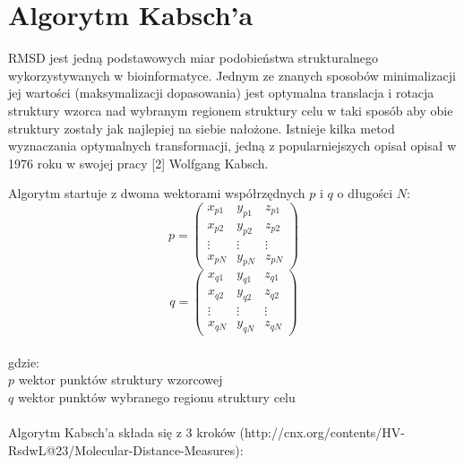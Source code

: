 \documentclass[licencjacka]{pracamgr}
\begin{document}
\section{Algorytm Kabsch'a}
RMSD jest jedną podstawowych miar podobieństwa strukturalnego wykorzystywanych w bioinformatyce. Jednym ze znanych sposobów minimalizacji jej wartości (maksymalizacji dopasowania) jest optymalna translacja i rotacja struktury wzorca nad wybranym regionem struktury celu w taki sposób aby obie struktury zostały jak najlepiej na siebie nałożone. Istnieje kilka metod wyznaczania optymalnych transformacji, jedną z popularniejszych opisał opisał w 1976 roku w swojej pracy [2] Wolfgang Kabsch.

Algorytm startuje z dwoma wektorami współrzędnych $p$ i $q$ o długości $N$:
$$
p=
\begin{pmatrix}
 x_{p1} & y_{p1} & z_{p1} \\
 x_{p2} & y_{p2} & z_{p2} \\
 \vdots & \vdots & \vdots \\
 x_{pN} & y_{pN} & z_{pN}
\end{pmatrix}
$$
$$
q= 
\begin{pmatrix}
 x_{q1} & y_{q1} & z_{q1} \\
 x_{q2} & y_{q2} & z_{q2} \\
 \vdots & \vdots & \vdots \\
 x_{qN} & y_{qN} & z_{qN}
\end{pmatrix}
$$
\\
gdzie:
\\
$p$ wektor punktów struktury wzorcowej
\\
$q$ wektor punktów wybranego regionu struktury celu
\\
\\
Algorytm Kabsch'a składa się z 3 kroków (http://cnx.org/contents/HV-RsdwL@23/Molecular-Distance-Measures):
\end{document}
